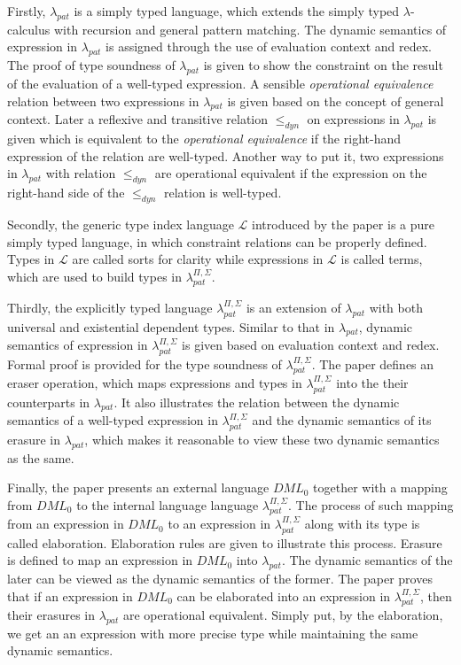 \documentclass{llncs}
\newcommand{\dmllampat}{$\lambda_{pat}$}
\newcommand{\dmlL}{$\mathcal{L}$}
\newcommand{\dmllamall}{$\lambda_{pat}^{\Pi,\Sigma}$}
\newcommand{\dmlzero}{$DML_0$}
\begin{document}
Firstly, \dmllampat{} is a simply typed language, which extends the
simply typed $\lambda$-calculus with recursion and general pattern matching. The
dynamic semantics of expression in \dmllampat{} is assigned through the use of
evaluation context and redex. The proof of type soundness of \dmllampat{} is
given to show the constraint on the result of the evaluation of a well-typed
expression. A sensible \emph{operational equivalence} relation
between two expressions in \dmllampat{} is given based on the concept of general
context. Later a reflexive and transitive relation $\leq_{dyn}$ on expressions in
\dmllampat{} is given which is equivalent to the \emph{operational equivalence} if the
right-hand expression of the relation are well-typed. Another way to put it,
two expressions in \dmllampat{} with relation $\leq_{dyn}$ are operational equivalent
if the expression on the right-hand side of the $\leq_{dyn}$ relation is well-typed.

Secondly, the generic type index language \dmlL{} introduced by the paper is a
pure simply typed language, in which
constraint relations can be properly defined. Types in \dmlL{} are called 
sorts for clarity while expressions in \dmlL{} is called terms, 
which are used to build types in \dmllamall.

Thirdly, the explicitly typed language \dmllamall{} is an extension of
\dmllampat{} with both universal and existential dependent types. Similar to
that in \dmllampat{}, dynamic
semantics of expression in \dmllamall{} is given based on 
evaluation context and redex. Formal proof
is provided for the type soundness of \dmllamall. The paper defines an
eraser operation, which maps expressions and types in \dmllamall{} into the
their counterparts in \dmllampat. It also illustrates the relation between
the dynamic semantics of a well-typed expression in \dmllamall{} and the
dynamic semantics of its erasure in \dmllampat, which makes it reasonable to
view these two dynamic semantics as the same.

Finally, the paper presents an external language \dmlzero{} together with a mapping
from \dmlzero{} to the internal language language \dmllamall. The process of such
mapping from an expression in \dmlzero{} to an expression in \dmllamall{} along with
its type is called elaboration. Elaboration rules are given to illustrate this
process. Erasure is defined to map an expression in \dmlzero{} into \dmllampat. The
dynamic semantics of the later can be viewed as the dynamic semantics of the
former. The paper proves that if an expression in \dmlzero{} can be elaborated into
an expression in \dmllamall, then their erasures in \dmllampat{} are operational
equivalent. Simply put, by the elaboration, we get an an expression with more
precise type while maintaining the same dynamic semantics.  
\end{document}
